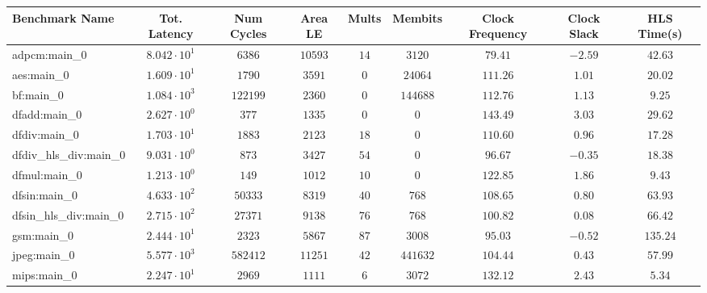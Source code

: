 \begin{tabular}{|l|c|c|c|c|c|c|c|c|}
\hline
Benchmark Name          & Tot. Latency           & Num Cycles & Area LE   & Mults   & Membits    & Clock Frequency & Clock Slack & HLS Time(s) \\
\hline
adpcm:main\_0           & $ 8.042 \cdot 10^{1} $ & $ 6386   $ & $ 10593 $ & $ 14  $ & $ 3120   $ & $ 79.41       $ & $ -2.59   $ & $ 42.63   $ \\
aes:main\_0             & $ 1.609 \cdot 10^{1} $ & $ 1790   $ & $ 3591  $ & $ 0   $ & $ 24064  $ & $ 111.26      $ & $ 1.01    $ & $ 20.02   $ \\
bf:main\_0              & $ 1.084 \cdot 10^{3} $ & $ 122199 $ & $ 2360  $ & $ 0   $ & $ 144688 $ & $ 112.76      $ & $ 1.13    $ & $ 9.25    $ \\
dfadd:main\_0           & $ 2.627 \cdot 10^{0} $ & $ 377    $ & $ 1335  $ & $ 0   $ & $ 0      $ & $ 143.49      $ & $ 3.03    $ & $ 29.62   $ \\
dfdiv:main\_0           & $ 1.703 \cdot 10^{1} $ & $ 1883   $ & $ 2123  $ & $ 18  $ & $ 0      $ & $ 110.60      $ & $ 0.96    $ & $ 17.28   $ \\
dfdiv\_hls\_div:main\_0 & $ 9.031 \cdot 10^{0} $ & $ 873    $ & $ 3427  $ & $ 54  $ & $ 0      $ & $ 96.67       $ & $ -0.35   $ & $ 18.38   $ \\
dfmul:main\_0           & $ 1.213 \cdot 10^{0} $ & $ 149    $ & $ 1012  $ & $ 10  $ & $ 0      $ & $ 122.85      $ & $ 1.86    $ & $ 9.43    $ \\
dfsin:main\_0           & $ 4.633 \cdot 10^{2} $ & $ 50333  $ & $ 8319  $ & $ 40  $ & $ 768    $ & $ 108.65      $ & $ 0.80    $ & $ 63.93   $ \\
dfsin\_hls\_div:main\_0 & $ 2.715 \cdot 10^{2} $ & $ 27371  $ & $ 9138  $ & $ 76  $ & $ 768    $ & $ 100.82      $ & $ 0.08    $ & $ 66.42   $ \\
gsm:main\_0             & $ 2.444 \cdot 10^{1} $ & $ 2323   $ & $ 5867  $ & $ 87  $ & $ 3008   $ & $ 95.03       $ & $ -0.52   $ & $ 135.24  $ \\
jpeg:main\_0            & $ 5.577 \cdot 10^{3} $ & $ 582412 $ & $ 11251 $ & $ 42  $ & $ 441632 $ & $ 104.44      $ & $ 0.43    $ & $ 57.99   $ \\
mips:main\_0            & $ 2.247 \cdot 10^{1} $ & $ 2969   $ & $ 1111  $ & $ 6   $ & $ 3072   $ & $ 132.12      $ & $ 2.43    $ & $ 5.34    $ \\

\end{tabular}
